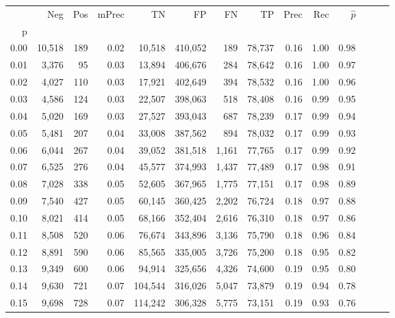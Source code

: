 \begin{tabular}{rrrrrrrrrrrrrr}
\toprule
{} &     Neg &    Pos & mPrec &       TN &       FP &      FN &      TP &  Prec &   Rec & $\hat{p}$ \\
p    &         &        &       &          &          &         &         &       &       &           \\
\midrule
0.00 &  10,518 &    189 &  0.02 &   10,518 &  410,052 &     189 &  78,737 &  0.16 &  1.00 &      0.98 \\
0.01 &   3,376 &     95 &  0.03 &   13,894 &  406,676 &     284 &  78,642 &  0.16 &  1.00 &      0.97 \\
0.02 &   4,027 &    110 &  0.03 &   17,921 &  402,649 &     394 &  78,532 &  0.16 &  1.00 &      0.96 \\
0.03 &   4,586 &    124 &  0.03 &   22,507 &  398,063 &     518 &  78,408 &  0.16 &  0.99 &      0.95 \\
0.04 &   5,020 &    169 &  0.03 &   27,527 &  393,043 &     687 &  78,239 &  0.17 &  0.99 &      0.94 \\
0.05 &   5,481 &    207 &  0.04 &   33,008 &  387,562 &     894 &  78,032 &  0.17 &  0.99 &      0.93 \\
0.06 &   6,044 &    267 &  0.04 &   39,052 &  381,518 &   1,161 &  77,765 &  0.17 &  0.99 &      0.92 \\
0.07 &   6,525 &    276 &  0.04 &   45,577 &  374,993 &   1,437 &  77,489 &  0.17 &  0.98 &      0.91 \\
0.08 &   7,028 &    338 &  0.05 &   52,605 &  367,965 &   1,775 &  77,151 &  0.17 &  0.98 &      0.89 \\
0.09 &   7,540 &    427 &  0.05 &   60,145 &  360,425 &   2,202 &  76,724 &  0.18 &  0.97 &      0.88 \\
0.10 &   8,021 &    414 &  0.05 &   68,166 &  352,404 &   2,616 &  76,310 &  0.18 &  0.97 &      0.86 \\
0.11 &   8,508 &    520 &  0.06 &   76,674 &  343,896 &   3,136 &  75,790 &  0.18 &  0.96 &      0.84 \\
0.12 &   8,891 &    590 &  0.06 &   85,565 &  335,005 &   3,726 &  75,200 &  0.18 &  0.95 &      0.82 \\
0.13 &   9,349 &    600 &  0.06 &   94,914 &  325,656 &   4,326 &  74,600 &  0.19 &  0.95 &      0.80 \\
0.14 &   9,630 &    721 &  0.07 &  104,544 &  316,026 &   5,047 &  73,879 &  0.19 &  0.94 &      0.78 \\
0.15 &   9,698 &    728 &  0.07 &  114,242 &  306,328 &   5,775 &  73,151 &  0.19 &  0.93 &      0.76 \\

\end{tabular}
